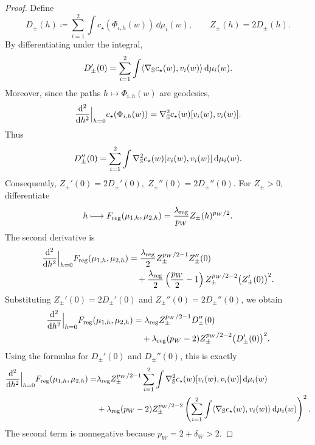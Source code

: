 \begin{proof}
Define
\[
    D_\pm(h)
    \coloneq
    \sum_{i=1}^2
    \int c_\star(\Phi_{i,h}(w))\,\dd\mu_i(w),
    \qquad
    Z_\pm(h)=2D_\pm(h).
\]
By differentiating under the integral,
\[
    D_\pm'(0)
    =
    \sum_{i=1}^2
    \int
        \langle \nabla_{\mathbb{S}} c_\star(w),v_i(w)\rangle
    \,\dd\mu_i(w).
\]
Moreover, since the paths \(h\mapsto \Phi_{i,h}(w)\) are geodesics,
\[
    \frac{\dd^2}{\dd h^2}\Big|_{h=0}
    c_\star(\Phi_{i,h}(w))
    =
    \nabla_{\mathbb{S}}^2 c_\star(w)[v_i(w),v_i(w)].
\]
Thus
\[
    D_\pm''(0)
    =
    \sum_{i=1}^2
    \int
        \nabla_{\mathbb{S}}^2 c_\star(w)[v_i(w),v_i(w)]
    \,\dd\mu_i(w).
\]
Consequently, $Z_\pm'(0)=2D_\pm'(0),\;
    Z_\pm''(0)=2D_\pm''(0).$
For \(Z_\pm>0\), differentiate
\[
    h\longmapsto
    F_{\mathrm{reg}}(\mu_{1,h},\mu_{2,h})
    =
    \frac{\lambda_{\mathrm{reg}}}{p_W}Z_\pm(h)^{p_W/2}.
\]
The second derivative is
\[
\begin{aligned}
    \frac{\dd^2}{\dd h^2}\Big|_{h=0}
    F_{\mathrm{reg}}(\mu_{1,h},\mu_{2,h})
    &=
    \frac{\lambda_{\mathrm{reg}}}{2}
    Z_\pm^{p_W/2-1}Z_\pm''(0)
    \\
    &\quad+
    \frac{\lambda_{\mathrm{reg}}}{2}
    \left(\frac{p_W}{2}-1\right)
    Z_\pm^{p_W/2-2}
    \bigl(Z_\pm'(0)\bigr)^2.
\end{aligned}
\]
Substituting \(Z_\pm'(0)=2D_\pm'(0)\) and \(Z_\pm''(0)=2D_\pm''(0)\), we obtain
\[
\begin{aligned}
    \frac{\dd^2}{\dd h^2}\Big|_{h=0}
    F_{\mathrm{reg}}(\mu_{1,h},\mu_{2,h})
    &=
    \lambda_{\mathrm{reg}} Z_\pm^{p_W/2-1}
    D_\pm''(0)
    \\
    &\quad+
    \lambda_{\mathrm{reg}}(p_W-2)Z_\pm^{p_W/2-2}
    \bigl(D_\pm'(0)\bigr)^2.
\end{aligned}
\]
Using the formulas for \(D_\pm'(0)\) and \(D_\pm''(0)\), this is exactly
\[
\begin{aligned}
    \frac{\dd^2}{\dd h^2}\Big|_{h=0}
    F_{\mathrm{reg}}(\mu_{1,h},\mu_{2,h})
    =&
    \lambda_{\mathrm{reg}} Z_\pm^{p_W/2-1}
    \sum_{i=1}^2
    \int
        \nabla_{\mathbb{S}}^2c_\star(w)[v_i(w),v_i(w)]
    \,\dd\mu_i(w)
    \\
    &+
    \lambda_{\mathrm{reg}}(p_W-2)Z_\pm^{p_W/2-2}
    \left(
        \sum_{i=1}^2
        \int
            \langle\nabla_{\mathbb{S}} c_\star(w),v_i(w)\rangle
        \,\dd\mu_i(w)
    \right)^2.
\end{aligned}
\]
The second term is nonnegative because \(p_W=2+\delta_W>2\).


\end{proof}
